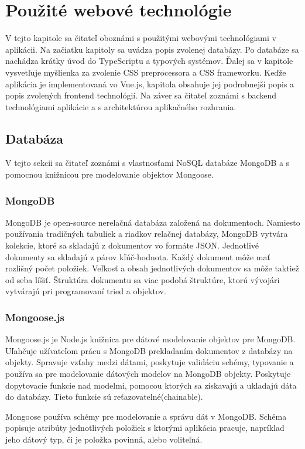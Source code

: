 \chapter{Použité webové technológie}
\label{kapitola3}
V tejto kapitole sa čitateľ oboznámi s použitými webovými technológiami v aplikácii. Na začiatku kapitoly sa uvádza popis zvolenej databázy. Po databáze sa nachádza krátky úvod do TypeScriptu a typových systémov. Ďalej sa v kapitole vysvetľuje myšlienka za zvolenie CSS preprocessora a CSS frameworku. Keďže aplikácia je implementovaná vo Vue.js, kapitola obsahuje jej podrobnejší popis a popis zvolených frontend technológií. Na záver sa čitateľ zoznámi s backend technológiami aplikácie a s architektúrou aplikačného rozhrania.

\section{Databáza}
V tejto sekcii sa čitateľ zoznámi s vlastnosťami NoSQL databáze MongoDB a s pomocnou knižnicou pre modelovanie objektov Mongoose. 

\subsection{MongoDB}
\label{mongodb}
MongoDB\cite{mongodb} je open-source nerelačná databáza založená na dokumentoch. Namiesto používania tradičných tabuliek a riadkov relačnej databázy, MongoDB vytvára kolekcie, ktoré sa skladajú z dokumentov vo formáte JSON. Jednotlivé dokumenty sa skladajú z párov kľúč-hodnota. Každý dokument môže mať rozlišný počet položiek. Veľkosť a obsah jednotlivých dokumentov sa môže taktiež od seba líšiť. Štruktúra dokumentu sa viac podobá štruktúre, ktorú vývojári vytvárajú pri programovaní tried a objektov. 

\subsection{Mongoose.js}
\label{mongoose}
Mongoose.js\cite{mongoose} je Node.js knižnica pre dátové modelovanie objektov pre MongoDB. Uľahčuje užívateľom prácu s MongoDB prekladaním dokumentov z databázy na objekty. Spravuje vzťahy medzi dátami, poskytuje validáciu schémy, typovanie a používa sa pre modelovanie dátových modelov na MongoDB objekty. Poskytuje dopytovacie funkcie nad modelmi, pomocou ktorých sa získavajú a ukladajú dáta do databázy. Tieto funkcie sú reťazovatelné(chainable). 

Mongoose používa schémy pre modelovanie a správu dát v MongoDB. Schéma popisuje atribúty jednotlivých položiek s ktorými aplikácia pracuje, napríklad jeho dátový typ, či je položka povinná, alebo voliteľná. 

